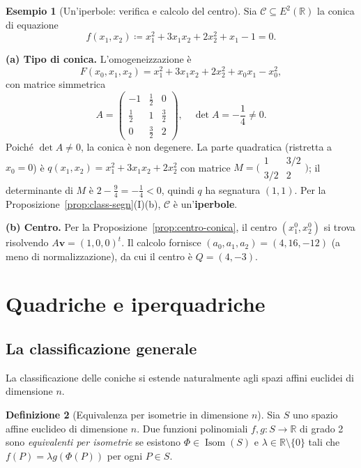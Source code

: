 \documentclass[11pt, a4paper]{book}
\theoremstyle{definition}
\newtheorem{definizione}{Definizione}[section]
\newtheorem{esempio}[definizione]{Esempio}
\theoremstyle{plain}
\theoremstyle{remark}
\newcommand{\R}{\mathbb{R}}
\DeclareMathOperator{\Isom}{Isom}
\begin{document}
\begin{exbox}
\begin{esempio}[Un'iperbole: verifica e calcolo del centro]
\label{es:iper-centro}
Sia $\mathcal{C} \subseteq E^2(\R)$ la conica di equazione
\[
  f(x_1,x_2) \coloneqq x_1^2 + 3x_1 x_2 + 2x_2^2 + x_1 - 1 = 0.
\]

\textbf{(a) Tipo di conica.} L'omogeneizzazione è
\[
  F(x_0,x_1,x_2) = x_1^2 + 3x_1x_2 + 2x_2^2 + x_0x_1 - x_0^2,
\]
con matrice simmetrica
\[
  A = \begin{pmatrix} -1 & \frac{1}{2} & 0 \\ \frac{1}{2} & 1 & \frac{3}{2} \\ 0 & \frac{3}{2} & 2 \end{pmatrix}, \quad \det A = -\frac{1}{4} \neq 0.
\]
Poiché $\det A \neq 0$, la conica è non degenere. La parte quadratica (ristretta a $x_0=0$) è $q(x_1,x_2) = x_1^2 + 3x_1x_2 + 2x_2^2$ con matrice $M = \bigl(\begin{smallmatrix}1 & 3/2 \\ 3/2 & 2\end{smallmatrix}\bigr)$; il determinante di $M$ è $2 - \frac{9}{4} = -\frac{1}{4} < 0$, quindi $q$ ha segnatura $(1,1)$. Per la Proposizione~\ref{prop:class-segn}(I)(b), $\mathcal{C}$ è un'\textbf{iperbole}.

\textbf{(b) Centro.} Per la Proposizione~\ref{prop:centro-conica}, il centro $(x_1^0, x_2^0)$ si trova risolvendo $A\mathbf{v} = (1,0,0)^t$. Il calcolo fornisce $(a_0, a_1, a_2) = (4, 16, -12)$ (a meno di normalizzazione), da cui il centro è $Q = (4, -3)$.
\end{esempio}
\end{exbox}

\section{Quadriche e iperquadriche}
\label{sec:quadriche}

\subsection{La classificazione generale}

La classificazione delle coniche si estende naturalmente agli spazi affini euclidei di dimensione $n$.

\begin{defbox}
\begin{definizione}[Equivalenza per isometrie in dimensione $n$]
\label{def:equiv-iso-n}
Sia $S$ uno spazio affine euclideo di dimensione $n$. Due funzioni polinomiali $f, g \colon S \to \R$ di grado 2 sono \emph{equivalenti per isometrie} se esistono $\Phi \in \Isom(S)$ e $\lambda \in \R \setminus \{0\}$ tali che $f(P) = \lambda g(\Phi(P))$ per ogni $P \in S$.
\end{definizione}
\end{defbox}
\end{document}
